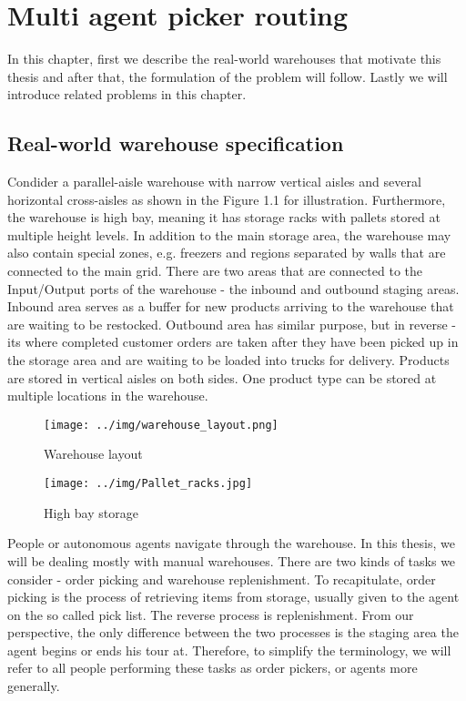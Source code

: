 \chapter{Multi agent picker routing}
In this chapter, first we describe the real-world warehouses that motivate this thesis and after that, the formulation of the problem will follow. Lastly we will introduce related problems in this chapter.

\section{Real-world warehouse specification}

Condider a parallel-aisle warehouse with narrow vertical aisles and several horizontal cross-aisles as shown in the Figure 1.1 for illustration. Furthermore, the warehouse is high bay, meaning it has storage racks with pallets stored at multiple height levels. In addition to the main storage area, the warehouse may also contain special zones, e.g. freezers and regions separated by walls that are connected to the main grid. There are two areas that are connected to the Input/Output ports of the warehouse - the inbound and outbound staging areas. Inbound area serves as a buffer for new products arriving to the warehouse that are waiting to be restocked. Outbound area has similar purpose, but in reverse - its where completed customer orders are taken after they have been picked up in the storage area and are waiting to be loaded into trucks for delivery. Products are stored in vertical aisles on both sides. One product type can be stored at multiple locations in the warehouse.

\begin{figure}[!b]
    \centering
    \begin{minipage}{0.45\textwidth}
        \centering
        \texttt{[image: ../img/warehouse\_layout.png]} %
        \caption{Warehouse layout}
    \end{minipage}\hfill
    \begin{minipage}{0.45\textwidth}
        \centering
        \texttt{[image: ../img/Pallet\_racks.jpg]}
        \caption{High bay storage}
    \end{minipage}
\end{figure}

People or autonomous agents navigate through the warehouse. In this thesis, we will be dealing mostly with manual warehouses. There are two kinds of tasks we consider - order picking and warehouse replenishment. To recapitulate, order picking is the process of retrieving items from storage, usually given to the agent on the so called pick list. The reverse process is replenishment. From our perspective, the only difference between the two processes is the staging area the agent begins or ends his tour at. Therefore, to simplify the terminology, we will refer to all people performing these tasks as order pickers, or agents more generally. 
\par

